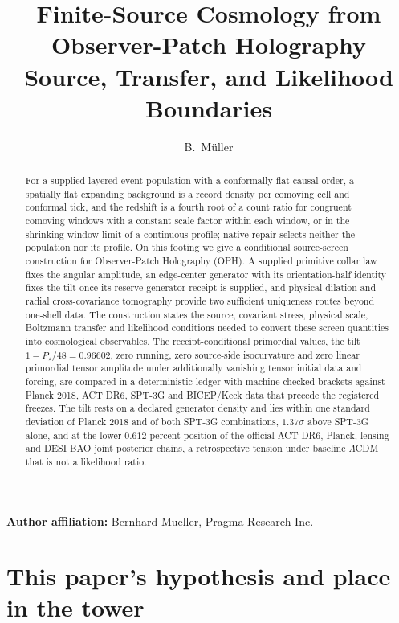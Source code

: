 \documentclass[11pt]{article}
\title{Finite-Source Cosmology from Observer-Patch Holography\\
\large Source, Transfer, and Likelihood Boundaries}
\author{B.\ M\"uller}
\date{\OPHPaperReleaseDate}
\theoremstyle{remark}
\begin{document}
\maketitle
\OPHPaperReleaseBanner

\begin{center}
\small\textbf{Author affiliation:} Bernhard Mueller, Pragma Research Inc.
\end{center}

\begin{abstract}
For a supplied layered event population with a conformally flat causal
order, a spatially flat expanding background is a record density per
comoving cell and conformal tick, and the redshift is a fourth root of a
count ratio for congruent comoving windows with a constant scale factor
within each window, or in the shrinking-window limit of a continuous
profile; native repair selects neither the population nor its profile. On
this footing we give a conditional source-screen construction for
Observer-Patch Holography (OPH). A supplied primitive collar law fixes the
angular amplitude, an edge-center generator with its orientation-half
identity fixes the tilt once its reserve-generator receipt is supplied, and
physical dilation and radial cross-covariance tomography provide two
sufficient uniqueness routes beyond one-shell data. The construction states
the source, covariant stress, physical scale, Boltzmann transfer and
likelihood conditions needed to convert these screen quantities into
cosmological observables. The receipt-conditional primordial values, the
tilt \(1-P_\star/48=0.96602\), zero running, zero source-side isocurvature
and zero linear primordial tensor amplitude under additionally vanishing
tensor initial data and forcing, are compared in a deterministic ledger with
machine-checked brackets against Planck 2018, ACT DR6, SPT-3G and BICEP/Keck
data that precede the registered freezes. The tilt rests on a declared
generator density and lies within one standard deviation of Planck 2018 and
of both SPT-3G combinations, \(1.37\sigma\) above SPT-3G alone, and at the lower
\(0.612\) percent position of the official ACT DR6, Planck, lensing and DESI
BAO joint posterior chains, a retrospective tension under baseline
\(\Lambda\)CDM that is not a likelihood ratio.
\end{abstract}



\section*{This paper's hypothesis and place in the tower}
\end{document}
